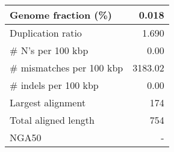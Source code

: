\documentclass[12pt,a4paper]{article}
\begin{document}
\begin{table}[ht]
\begin{center}
\begin{tabular}{|l*{1}{|r}|}
Genome fraction (\%) & 0.018 \\ \hline
Duplication ratio & 1.690 \\ \hline
\# N's per 100 kbp & 0.00 \\ \hline
\# mismatches per 100 kbp & 3183.02 \\ \hline
\# indels per 100 kbp & 0.00 \\ \hline
Largest alignment & 174 \\ \hline
Total aligned length & 754 \\ \hline
NGA50 & - \\ \hline
\end{tabular}
\end{center}
\end{table}
\end{document}
